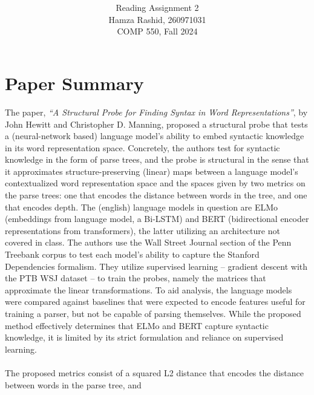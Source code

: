 \documentclass[11pt]{article}
\title{ }
\author{ Reading Assignment 2 \\ Hamza Rashid, 260971031 \\ COMP 550, Fall 2024}
\date{}
\begin{document}
\maketitle

\vspace{-5ex}
\section*{Paper Summary}
The paper, \textit{“A Structural Probe for Finding 
Syntax in Word Representations”}, by John Hewitt and Christopher D. Manning,
proposed a structural probe that tests a (neural-network based) 
language model's ability to embed syntactic knowledge 
in its word representation space. Concretely, the authors
test for syntactic knowledge in the form of parse trees, and
the probe is structural in the sense that it approximates
structure-preserving (linear) maps
between a language model's contextualized word representation space and 
the spaces given by two metrics on the parse trees: one that encodes the
distance between words in the tree, and one that encodes depth.
The (english) language models in question are ELMo (embeddings from language model, a Bi-LSTM)
and BERT (bidirectional encoder representations from transformers), 
the latter utilizing an architecture not covered in class. The authors use the Wall Street Journal section of the 
Penn Treebank corpus to test each model's ability to capture
the Stanford Dependencies formalism. 
They utilize supervised learning – gradient descent with the PTB WSJ dataset –
to train the probes, namely the matrices that 
approximate the linear transformations.
To aid analysis, the language models
were compared against baselines that were expected to 
encode features useful for training a parser, but not be capable of
parsing themselves. While the proposed method effectively determines
that ELMo and BERT capture syntactic knowledge, it is limited by its 
strict formulation and reliance on supervised learning.
\\
\\
The proposed metrics consist of a squared L2 distance that encodes the 
distance between words in the parse tree, and
\end{document}
